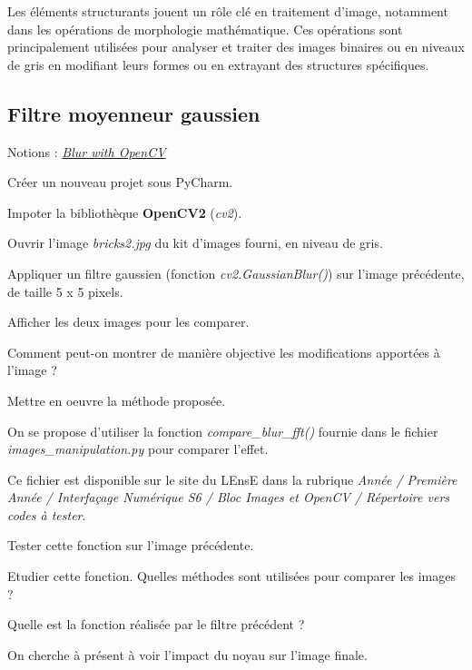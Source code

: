 \documentclass[a4paper,11pt,titlepage]{article} %
\begin{document}
Les éléments structurants jouent un rôle clé en traitement d'image, notamment dans les opérations de morphologie mathématique. Ces opérations sont principalement utilisées pour analyser et traiter des images binaires ou en niveaux de gris en modifiant leurs formes ou en extrayant des structures spécifiques.


\subsection{Filtre moyenneur gaussien}

\begin{mdframed}[style=sidebar,frametitle={}]
Notions : \href{https://iogs-lense-training.github.io/image-processing/contents/opencv_blur.html#blur-with-opencv
}{\textit{Blur with OpenCV}}
\end{mdframed}

\Manip Créer un nouveau projet sous PyCharm.

\Manip Impoter la bibliothèque \textbf{OpenCV2} (\textit{cv2}).

\Manip Ouvrir l'image \textsl{bricks2.jpg} du kit d'images fourni, en niveau de gris.

\Manip Appliquer un filtre gaussien (fonction \textsl{cv2.GaussianBlur()}) sur l'image précédente, de taille 5 x 5 pixels.

\Manip Afficher les deux images pour les comparer.

\Quest Comment peut-on montrer de manière objective les modifications apportées à l'image ? 

\Manip Mettre en oeuvre la méthode proposée.

\medskip

On se propose d'utiliser la fonction \textsl{compare\_blur\_fft()} fournie dans le fichier \textsl{images\_manipulation.py} pour comparer l'effet. 

Ce fichier est disponible sur le site du LEnsE dans la rubrique \textit{Année / Première Année / Interfaçage Numérique S6 / Bloc Images et OpenCV / Répertoire vers codes à tester}.

\Manip Tester cette fonction sur l'image précédente.

\Quest Etudier cette fonction. Quelles méthodes sont utilisées pour comparer les images ?

\Quest Quelle est la fonction réalisée par le filtre précédent ?

\medskip

On cherche à présent à voir l'impact du noyau sur l'image finale.
\end{document}
